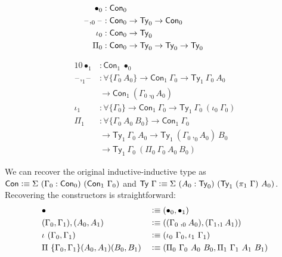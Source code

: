 \documentclass[autoref]{llncs}
\newcommand{\GG}{\Gamma}
\newcommand{\blank}{\mathord{\hspace{1pt}\text{--}\hspace{1pt}}}
\newcommand{\defeq}{\mathrel{\vcentcolon\equiv}}
\begin{document}
{\small
\begin{minipage}{0.4\textwidth}
\begin{align*}
  \bullet_0 &: \textsf{Con}_0 \\
  \blank,_0\blank &: \textsf{Con}_0 \to \textsf{Ty}_0 \to \textsf{Con}_0 \\
  \iota_0 &: \textsf{Con}_0 \to \textsf{Ty}_0 \\
  \Pi_0 &: \textsf{Con}_0 \to \textsf{Ty}_0 \to \textsf{Ty}_0 \to \textsf{Ty}_0 \hspace{2.8em} \\
\end{align*}
\end{minipage}
\begin{minipage}{0.5\textwidth}
\vspace{-1.3em}
\begin{alignat*}{10}
  \bullet_1 &: \textsf{Con}_1\ \bullet_0 \\
  \blank,_1\blank &: \forall\{\GG_0\ A_0\} \to \textsf{Con}_1\ \GG_0 \to \textsf{Ty}_1\ \GG_0\ A_0 \\
  & \to \textsf{Con}_1\ (\GG_0 \,,_0 A_0) \\
  \iota_1 &: \forall\{\GG_0\} \to \textsf{Con}_1\ \GG_0 \to \textsf{Ty}_1\ \GG_0\ (\iota_0\ \GG_0) \\
  \Pi_1 &: \forall\{\GG_0\ A_0\ B_0\} \to \textsf{Con}_1\ \GG_0 \\
  & \to \textsf{Ty}_1\ \GG_0\ A_0 \to \textsf{Ty}_1\ (\GG_0\, ,_0 A_0)\ B_0 \\
  & \to \textsf{Ty}_1\ \GG_0\ (\Pi_0\ \GG_0\ A_0\ B_0)
\end{alignat*}
\end{minipage}}\vspace{0.4em}

We can recover the original inductive-inductive type as $\textsf{Con} \defeq
\Sigma\ (\GG_0 : \textsf{Con}_0)\ (\textsf{Con}_1\ \GG_0)$ and $\textsf{Ty}\ \GG
\defeq \Sigma\ (A_0 :
\textsf{Ty}_0)\ (\textsf{Ty}_1\ (\pi_1\ \GG)\ A_0)$. Recovering the constructors
is straightforward:
{\small\vspace{-0.2em}
\begin{alignat*}{10}
  & \bullet && \defeq (\bullet_0 , \bullet_1) \\
  & (\GG_0 , \GG_1) , (A_0 , A_1) && \defeq ((\GG_0 \mathbin{,_0} A_0) , (\GG_1 ,_1 A_1)) \\
  & \iota\ (\GG_0 , \GG_1) && \defeq (\iota_0\ \GG_0 , \iota_1\ \GG_1) \\
  & \Pi\ \{\GG_0 , \GG_1\}(A_0 , A_1) (B_0 , B_1) && \defeq
    (\Pi_0\ \GG_0\ A_0\ B_0 , \Pi_1\ \GG_1\ A_1\ B_1)
\end{alignat*}}\vspace{-1em}
\end{document}
